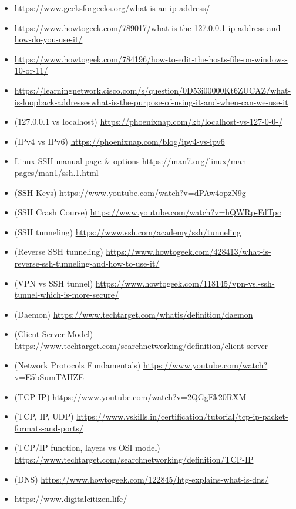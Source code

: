 \documentclass[a4paper, 10pt]{article}
\begin{document}
\begin{itemize}
        \item \url{https://www.geeksforgeeks.org/what-is-an-ip-address/}
        \item \url{https://www.howtogeek.com/789017/what-is-the-127.0.0.1-ip-address-and-how-do-you-use-it/}
        \item \url{https://www.howtogeek.com/784196/how-to-edit-the-hosts-file-on-windows-10-or-11/}
        \item \url{https://learningnetwork.cisco.com/s/question/0D53i00000Kt6ZUCAZ/what-is-loopback-addresseswhat-is-the-purpose-of-using-it-and-when-can-we-use-it}
        \item (127.0.0.1 vs localhost) \url{https://phoenixnap.com/kb/localhost-vs-127-0-0-/}
        \item (IPv4 vs IPv6) \url{https://phoenixnap.com/blog/ipv4-vs-ipv6}
        \item Linux SSH manual page & options \url{https://man7.org/linux/man-pages/man1/ssh.1.html}
        \item (SSH Keys) \url{https://www.youtube.com/watch?v=dPAw4opzN9g}
        \item (SSH Crash Course) \url{https://www.youtube.com/watch?v=hQWRp-FdTpc}
        \item (SSH tunneling) \url{https://www.ssh.com/academy/ssh/tunneling}
        \item (Reverse SSH tunneling) \url{https://www.howtogeek.com/428413/what-is-reverse-ssh-tunneling-and-how-to-use-it/}
        \item (VPN vs SSH tunnel) \url{https://www.howtogeek.com/118145/vpn-vs.-ssh-tunnel-which-is-more-secure/}
        \item (Daemon) \url{https://www.techtarget.com/whatis/definition/daemon}
        \item (Client-Server Model) \url{https://www.techtarget.com/searchnetworking/definition/client-server}
        \item (Network Protocols Fundamentals) \url{https://www.youtube.com/watch?v=E5bSumTAHZE}
        \item (TCP IP) \url{https://www.youtube.com/watch?v=2QGgEk20RXM}
        \item (TCP, IP, UDP) \url{https://www.vskills.in/certification/tutorial/tcp-ip-packet-formats-and-ports/}
        \item (TCP/IP function, layers vs OSI model) \url{https://www.techtarget.com/searchnetworking/definition/TCP-IP}
        \item (DNS) \url{https://www.howtogeek.com/122845/htg-explains-what-is-dns/}
        \item \url{https://www.digitalcitizen.life/}
        \end{itemize}
\end{document}
